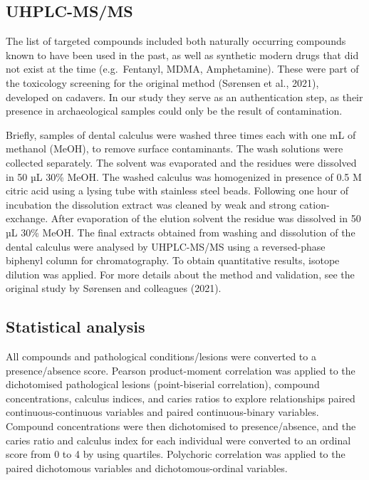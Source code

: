 \documentclass[
]{article}
\begin{document}
\subsection{UHPLC-MS/MS}\label{uhplc-msms}

The list of targeted compounds included both naturally occurring
compounds known to have been used in the past, as well as synthetic
modern drugs that did not exist at the time (e.g.~Fentanyl, MDMA,
Amphetamine). These were part of the toxicology screening for the
original method (Sørensen et al., 2021), developed on cadavers. In our
study they serve as an authentication step, as their presence in
archaeological samples could only be the result of contamination.

Briefly, samples of dental calculus were washed three times each with
one mL of methanol (MeOH), to remove surface contaminants. The wash
solutions were collected separately. The solvent was evaporated and the
residues were dissolved in 50 µL 30\% MeOH. The washed calculus was
homogenized in presence of 0.5 M citric acid using a lysing tube with
stainless steel beads. Following one hour of incubation the dissolution
extract was cleaned by weak and strong cation-exchange. After
evaporation of the elution solvent the residue was dissolved in 50 µL
30\% MeOH. The final extracts obtained from washing and dissolution of
the dental calculus were analysed by UHPLC-MS/MS using a reversed-phase
biphenyl column for chromatography. To obtain quantitative results,
isotope dilution was applied. For more details about the method and
validation, see the original study by Sørensen and colleagues (2021).

\subsection{Statistical analysis}\label{statistical-analysis}

All compounds and pathological conditions/lesions were converted to a
presence/absence score. Pearson product-moment correlation was applied
to the dichotomised pathological lesions (point-biserial correlation),
compound concentrations, calculus indices, and caries ratios to explore
relationships paired continuous-continuous variables and paired
continuous-binary variables. Compound concentrations were then
dichotomised to presence/absence, and the caries ratio and calculus
index for each individual were converted to an ordinal score from 0 to 4
by using quartiles. Polychoric correlation was applied to the paired
dichotomous variables and dichotomous-ordinal variables.
\end{document}
